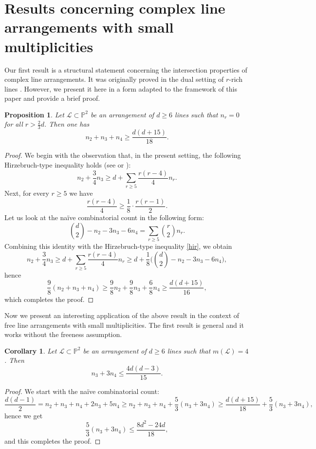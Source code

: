 \documentclass[11pt]{article}
\theoremstyle{plain}
\newtheorem{proposition}[theorem]{Proposition}
\newtheorem{corollary}[theorem]{Corollary}
\theoremstyle{definition}
\theoremstyle{remark}
\begin{document}
\section{Results concerning complex line arrangements with small multiplicities}
Our first result is a structural statement concerning the intersection properties of complex line arrangements. It was originally proved in the dual setting of $r$-rich lines \cite[Proposition 31]{PP1}. However, we present it here in a form adapted to the framework of this paper and provide a brief proof.
\begin{proposition}
Let $\mathcal{L} \subset \mathbb{P}^{2}$ be an arrangement of $d\geq 6$ lines such that $n_{r} = 0$ for all $r > \frac{2}{3}d$. Then one has
\[n_{2} + n_{3} + n_{4} \geq \frac{d(d+15)}{18}.\]
\end{proposition}
\begin{proof}
We begin with the observation that, in the present setting, the following Hirzebruch-type inequality holds (see \cite[Section 11]{Langer} or \cite[Remark 2.4]{PP}):
\begin{equation}
\label{hir}
    n_{2} + \frac{3}{4}n_{3} \geq d + \sum_{r\geq 5}\frac{r(r-4)}{4}n_{r}.
\end{equation}
Next, for every $r\geq 5$ we have 
\[\frac{r(r-4)}{4} \geq \frac{1}{8} \cdot\frac{r(r-1)}{2}.\]
Let us look at the na\"ive combinatorial count in the following form:
$$\binom{d}{2} - n_{2} - 3n_{3} - 6n_{4} = \sum_{r\geq5} \binom{r}{2}n_{r}.$$
Combining this identity with the Hirzebruch-type inequality \eqref{hir}, we obtain
$$n_{2}+\frac{3}{4}n_{3} \geq d + \sum_{r\geq 5}\frac{r(r-4)}{4}n_{r} \geq d + \frac{1}{8}\bigg(\binom{d}{2}-n_{2}-3n_{3} - 6n_{4}\bigg),$$
hence
$$\frac{9}{8}(n_{2} + n_{3}+n_{4}) \geq \frac{9}{8}n_{2} + \frac{9}{8}n_{3} + \frac{6}{8}n_{4} \geq \frac{d(d+15)}{16},$$
which completes the proof.
\end{proof}
Now we present an interesting application of the above result in the context of free line arrangements with small multiplicities. The first result is general and it works without the freeness assumption.
\begin{corollary}
\label{bbb}
Let $\mathcal{L} \subset \mathbb{P}^{2}$ be an arrangement of $d\geq 6$ lines such that $m(\mathcal{L})=4$. Then
$$n_{3}+3n_{4} \leq \frac{4d(d-3)}{15}.$$
\end{corollary} 
\begin{proof}
We start with the na\"ive combinatorial count:
\[ \frac{d(d-1)}{2} = n_{2} + n_{3} + n_{4} + 2n_{3}+5n_{4} \geq n_{2}+n_{3}+n_{4} + \frac{5}{3}(n_{3}+3n_{4})\geq \frac{d(d+15)}{18}+\frac{5}{3}(n_{3}+3n_{4}),\]
hence we get
$$\frac{5}{3}(n_{3}+3n_{4}) \leq \frac{8d^{2}-24d}{18},$$
and this completes the proof.
\end{proof}
\end{document}
